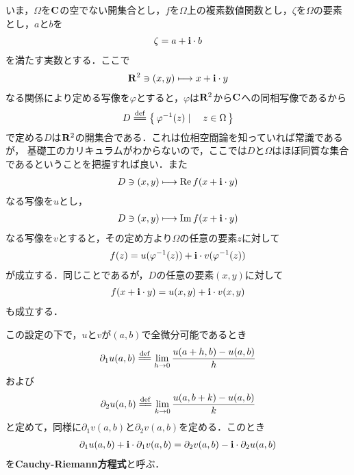 	いま，$\Omega$を$\mathbf{C}$の空でない開集合とし，$f$を$\Omega$上の複素数値関数とし，$\zeta$を$\Omega$の要素とし，$a$と$b$を
	\begin{align}
		\zeta = a + \mathbf{i} \cdot b
	\end{align}
	を満たす実数とする．ここで
	\begin{align}
		\mathbf{R}^2 \ni (x,y) \longmapsto x + \mathbf{i} \cdot y
	\end{align}
	なる関係により定める写像を$\varphi$とすると，$\varphi$は$\mathbf{R}^2$から$\mathbf{C}$への同相写像であるから
	\begin{align}
		D \defeq \Set{\varphi^{-1}(z)}{z \in \Omega}
	\end{align}
	で定める$D$は$\mathbf{R}^2$の開集合である．これは位相空間論を知っていれば常識であるが，
	基礎工のカリキュラムがわからないので，ここでは$D$と$\Omega$はほぼ同質な集合であるということを把握すれば良い．また
	\begin{align}
		D \ni (x,y) \longmapsto \operatorname{Re} f(x + \mathbf{i} \cdot y)
	\end{align}
	なる写像を$u$とし，
	\begin{align}
		D \ni (x,y) \longmapsto \operatorname{Im} f(x + \mathbf{i} \cdot y)
	\end{align}
	なる写像を$v$とすると，その定め方より$\Omega$の任意の要素$z$に対して
	\begin{align}
		f(z) = u(\varphi^{-1}(z)) + \mathbf{i} \cdot v(\varphi^{-1}(z))
	\end{align}
	が成立する．同じことであるが，$D$の任意の要素$(x,y)$に対して
	\begin{align}
		f(x + \mathbf{i} \cdot y) = u(x,y) + \mathbf{i} \cdot v(x,y)
	\end{align}
	も成立する．
	
	この設定の下で，$u$と$v$が$(a,b)$で全微分可能であるとき
	\begin{align}
		\partial_1 u(a,b) \defeq \lim_{h \to 0} \frac{u(a+h,b) - u(a,b)}{h}
	\end{align}
	および
	\begin{align}
		\partial_2 u(a,b) \defeq \lim_{k \to 0} \frac{u(a,b+k) - u(a,b)}{k}
	\end{align}
	と定めて，同様に$\partial_1 v(a,b)$と$\partial_2 v(a,b)$を定める．このとき
	\begin{align}
		\partial_1 u(a,b) + \mathbf{i} \cdot \partial_1 v(a,b)
		= \partial_2 v(a,b) - \mathbf{i} \cdot \partial_2 u(a,b)
	\end{align}
	を{\bf Cauchy-Riemann方程式}と呼ぶ．
	
